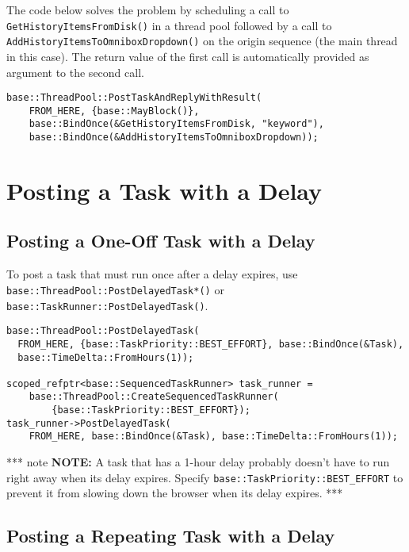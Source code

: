 \documentclass[a4paper,12pt,notitlepage,twoside,openright]{article}
\begin{document}
The code below solves the problem by scheduling a call to
\texttt{GetHistoryItemsFromDisk()} in a thread pool followed by a call
to \texttt{AddHistoryItemsToOmniboxDropdown()} on the origin sequence
(the main thread in this case). The return value of the first call is
automatically provided as argument to the second call.

\begin{verbatim}
base::ThreadPool::PostTaskAndReplyWithResult(
    FROM_HERE, {base::MayBlock()},
    base::BindOnce(&GetHistoryItemsFromDisk, "keyword"),
    base::BindOnce(&AddHistoryItemsToOmniboxDropdown));
\end{verbatim}

\hypertarget{posting-a-task-with-a-delay}{%
\section{Posting a Task with a
Delay}\label{posting-a-task-with-a-delay}}

\hypertarget{posting-a-one-off-task-with-a-delay}{%
\subsection{Posting a One-Off Task with a
Delay}\label{posting-a-one-off-task-with-a-delay}}

To post a task that must run once after a delay expires, use
\texttt{base::ThreadPool::PostDelayedTask*()} or
\texttt{base::TaskRunner::PostDelayedTask()}.

\begin{verbatim}
base::ThreadPool::PostDelayedTask(
  FROM_HERE, {base::TaskPriority::BEST_EFFORT}, base::BindOnce(&Task),
  base::TimeDelta::FromHours(1));

scoped_refptr<base::SequencedTaskRunner> task_runner =
    base::ThreadPool::CreateSequencedTaskRunner(
        {base::TaskPriority::BEST_EFFORT});
task_runner->PostDelayedTask(
    FROM_HERE, base::BindOnce(&Task), base::TimeDelta::FromHours(1));
\end{verbatim}

*** note \textbf{NOTE:} A task that has a 1-hour delay probably doesn't
have to run right away when its delay expires. Specify
\texttt{base::TaskPriority::BEST\_EFFORT} to prevent it from slowing
down the browser when its delay expires. ***

\hypertarget{posting-a-repeating-task-with-a-delay}{%
\subsection{Posting a Repeating Task with a
Delay}\label{posting-a-repeating-task-with-a-delay}}
\end{document}
